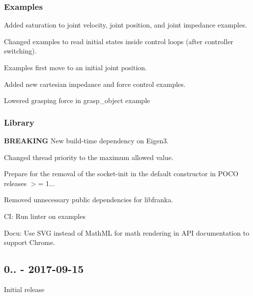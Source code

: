 \subsubsection*{Examples}


\begin{DoxyItemize}
\item Added saturation to joint velocity, joint position, and joint impedance examples.
\item Changed examples to read initial states inside control loops (after controller switching).
\item Examples first move to an initial joint position.
\item Added new cartesian impedance and force control examples.
\item Lowered grasping force in {\ttfamily grasp\+\_\+object} example
\end{DoxyItemize}

\subsubsection*{Library}


\begin{DoxyItemize}
\item {\bfseries B\+R\+E\+A\+K\+I\+NG} New build-\/time dependency on Eigen3.
\item Changed thread priority to the maximum allowed value.
\item Prepare for the removal of the socket-\/init in the default constructor in P\+O\+CO releases $>$= 1...
\item Removed unnecessary public dependencies for libfranka.
\item CI\+: Run linter on examples
\item Docu\+: Use S\+VG instead of Math\+ML for math rendering in A\+PI documentation to support Chrome.
\end{DoxyItemize}

\subsection*{0.. -\/ 2017-\/09-\/15}


\begin{DoxyItemize}
\item Initial release 
\end{DoxyItemize}